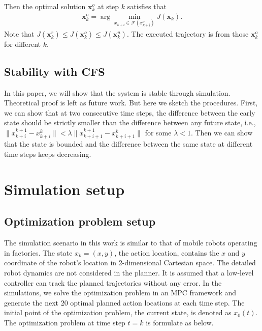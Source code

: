 \documentclass{ifacconf}
\begin{document}
Then the optimal solution $\mathbf{x}_k^{o}$ at step $k$ satisfies that
\begin{eqnarray}
\mathbf{x}_k^{o} = \arg\min_{x_{k+i}\in \mathcal{F}(x_{k+i}^o)}J(\mathbf{x}_k).
\end{eqnarray}
Note that $J(\mathbf{x}_k^{r})\leq J(\mathbf{x}_k^{o})\leq J(\mathbf{x}_k^{u})$. 
The executed trajectory is from those $\mathbf{x}_k^{o}$ for different $k$.


\subsection{Stability with CFS}
In this paper, we will show that the system is stable through simulation. Theoretical proof is left as future work. But here we sketch the procedures. First, we can show that at two consecutive time steps, the difference between the early state should be strictly smaller than the difference between any future state, i.e., $\|x_{k+i}^{k+1}-x_{k+i}^k\|<\lambda\|x_{k+i+1}^{k+1}-x_{k+i+1}^k\|$ for some $\lambda<1$. Then we can show that the state is bounded and the difference between the same state at different time steps keeps decreasing.
%
%

\section{Simulation setup}
\subsection{Optimization problem setup}
The simulation scenario in this work is similar to that of mobile robots operating in factories. The state $x_{k} = (x,y)$, the action location, contains the $x$ and $y$ coordinate of the robot's location in 2-dimensional Cartesian space. The detailed robot dynamics are not considered in the planner.  It is assumed that a low-level controller can track the planned trajectories without any error. In the simulations, we solve the optimization problem in an MPC framework and generate the next 20 optimal planned action locations at each time step. The initial point of the optimization problem, the current state, is denoted as $x_0(t)$. The optimization problem at time step $t=k$ is formulate as below. 
\end{document}
